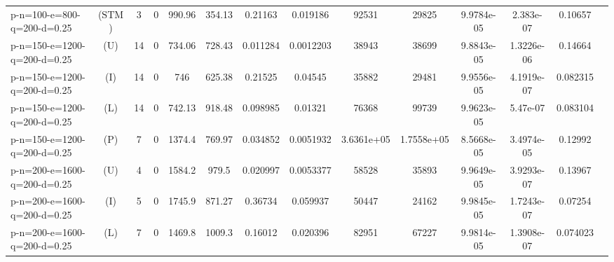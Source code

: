 \documentclass[landscape, a4paper]{article}
\newcommand{\STM}{\ensuremath{\mathrm{STM}}}
\newcommand{\Improved}{\ensuremath{\mathrm{I}}}
\newcommand{\Loose}{\ensuremath{\mathrm{L}}}
\newcommand{\Profit}{\ensuremath{\mathrm{P}}}
\newcommand{\Utility}{\ensuremath{\mathrm{U}}}
\begin{document}
\begin{center}
\begin{tabular}{lccccccccccccc}
p-n=100-e=800-q=200-d=0.25 & (\STM) & 3 & 0 & 990.96 & 354.13 & 0.21163 & 0.019186 & 92531 & 29825 & 9.9784e-05 & 2.383e-07 & 0.10657 & \\
p-n=150-e=1200-q=200-d=0.25 & (\Utility) & 14 & 0 & 734.06 & 728.43 & 0.011284 & 0.0012203 & 38943 & 38699 & 9.8843e-05 & 1.3226e-06 & 0.14664 & \\
p-n=150-e=1200-q=200-d=0.25 & (\Improved) & 14 & 0 & 746 & 625.38 & 0.21525 & 0.04545 & 35882 & 29481 & 9.9556e-05 & 4.1919e-07 & 0.082315 & \\
p-n=150-e=1200-q=200-d=0.25 & (\Loose) & 14 & 0 & 742.13 & 918.48 & 0.098985 & 0.01321 & 76368 & 99739 & 9.9623e-05 & 5.47e-07 & 0.083104 & \\
p-n=150-e=1200-q=200-d=0.25 & (\Profit) & 7 & 0 & 1374.4 & 769.97 & 0.034852 & 0.0051932 & 3.6361e+05 & 1.7558e+05 & 8.5668e-05 & 3.4974e-05 & 0.12992 & \\
p-n=200-e=1600-q=200-d=0.25 & (\Utility) & 4 & 0 & 1584.2 & 979.5 & 0.020997 & 0.0053377 & 58528 & 35893 & 9.9649e-05 & 3.9293e-07 & 0.13967 & \\
p-n=200-e=1600-q=200-d=0.25 & (\Improved) & 5 & 0 & 1745.9 & 871.27 & 0.36734 & 0.059937 & 50447 & 24162 & 9.9845e-05 & 1.7243e-07 & 0.07254 & \\
p-n=200-e=1600-q=200-d=0.25 & (\Loose) & 7 & 0 & 1469.8 & 1009.3 & 0.16012 & 0.020396 & 82951 & 67227 & 9.9814e-05 & 1.3908e-07 & 0.074023 & \\
\end{tabular}
\end{center}
\end{document}
